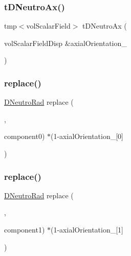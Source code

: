 \subsubsection{\texorpdfstring{t\+D\+Neutro\+Ax()}{tDNeutroAx()}}
{\footnotesize\ttfamily tmp$<$vol\+Scalar\+Field$>$ t\+D\+Neutro\+Ax (\begin{DoxyParamCaption}\item[{new }]{vol\+Scalar\+FieldDisp \&axial\+Orientation\+\_\+ }\end{DoxyParamCaption})}

\mbox{\label{setNeutronicsVariables_8H_ac63c673bca144ef7bb27f93a31b21ef3}} 
\subsubsection{\texorpdfstring{replace()}{replace()}\hspace{0.1cm}{\footnotesize\ttfamily [1/3]}}
{\footnotesize\ttfamily \hyperlink{setNeutronicsVariablesLowMem_8H_a87a8e73540cc64ca6321cea333ded9ac}{D\+Neutro\+Rad} replace (\begin{DoxyParamCaption}\item[{0}]{,  }\item[{D\+Neutro\+Rad.}]{component0) $\ast$(1-\/axial\+Orientation\+\_\+\mbox{[}0\mbox{]} }\end{DoxyParamCaption})}

\mbox{\label{setNeutronicsVariables_8H_a7c1faf6ceb840262125e7eadc454b715}} 
\subsubsection{\texorpdfstring{replace()}{replace()}\hspace{0.1cm}{\footnotesize\ttfamily [2/3]}}
{\footnotesize\ttfamily \hyperlink{setNeutronicsVariablesLowMem_8H_a87a8e73540cc64ca6321cea333ded9ac}{D\+Neutro\+Rad} replace (\begin{DoxyParamCaption}\item[{1}]{,  }\item[{D\+Neutro\+Rad.}]{component1) $\ast$(1-\/axial\+Orientation\+\_\+\mbox{[}1\mbox{]} }\end{DoxyParamCaption})}

